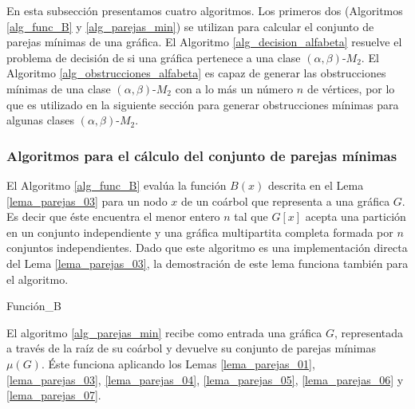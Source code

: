 En esta subsección presentamos cuatro algoritmos. Los primeros dos (Algoritmos \ref{alg_func_B} y \ref{alg_parejas_min}) se utilizan para calcular el conjunto de parejas mínimas de una gráfica. El Algoritmo \ref{alg_decision_alfabeta} resuelve el problema de decisión de si una gráfica pertenece a una clase $(\alpha,\beta)$-$M_2$. El Algoritmo \ref{alg_obstrucciones_alfabeta} es capaz de generar las obstrucciones mínimas de una clase $(\alpha,\beta)$-$M_2$ con a lo más un número $n$ de vértices, por lo que es utilizado en la siguiente sección para generar obstrucciones mínimas para algunas clases $(\alpha,\beta)$-$M_2$.

\subsubsection{Algoritmos para el cálculo del conjunto de parejas mínimas}

El Algoritmo \ref{alg_func_B} evalúa la función $B(x)$ descrita en el Lema \ref{lema_parejas_03} para un nodo $x$ de un coárbol que representa a una gráfica $G$. Es decir que éste encuentra el menor entero $n$ tal que $G[x]$ acepta una partición en un conjunto independiente y una gráfica multipartita completa formada por  $n$ conjuntos independientes. Dado que este algoritmo es una implementación directa del Lema \ref{lema_parejas_03}, la demostración de este lema funciona también para el algoritmo.

\begin{algorithm}[ht!]
\caption{Función\_B}
\label{alg_func_B}
\DontPrintSemicolon %


\end{algorithm}

El algoritmo \ref{alg_parejas_min} recibe como entrada una gráfica $G$, representada a través de la raíz de su coárbol y devuelve su conjunto de parejas mínimas $\mu(G)$. Éste funciona aplicando los Lemas \ref{lema_parejas_01}, \ref{lema_parejas_03}, \ref{lema_parejas_04}, \ref{lema_parejas_05}, \ref{lema_parejas_06} y \ref{lema_parejas_07}.

